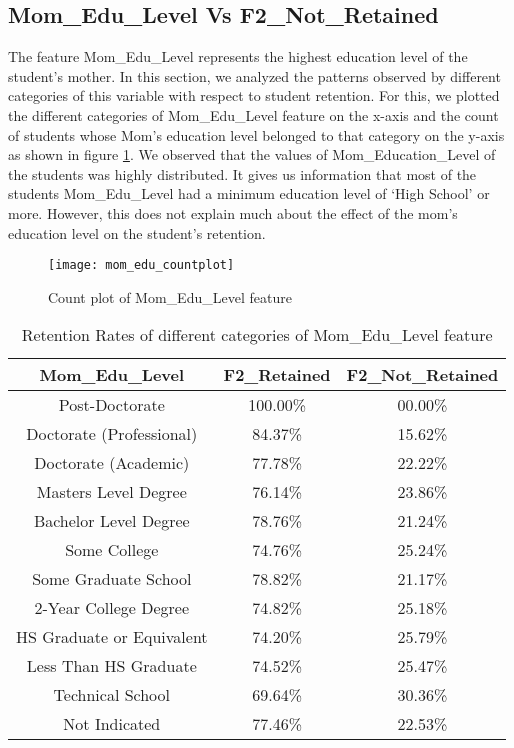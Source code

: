\documentclass[11pt,openright]{report}
\begin{document}
\subsection {Mom\_Edu\_Level	 Vs F2\_Not\_Retained}
The feature Mom\_Edu\_Level represents the highest education level of the student's mother. In this section, we analyzed the patterns observed by different categories of this variable with respect to student retention. For this, we plotted the different categories of Mom\_Edu\_Level feature on the x-axis and the count of students whose Mom's education level belonged to that category on the y-axis as shown in figure \ref{fig:mom_edu_F2NotRetained_plot}. We observed that the values of Mom\_Education\_Level of the students was highly distributed. It gives us information that most of the students Mom\_Edu\_Level had a minimum education level of `High School' or more. However, this does not explain much about the effect of the mom's education level on the student's retention.

\begin{figure}[!ht]
	\centering
	\texttt{[image: mom\_edu\_countplot]}
	\caption{Count plot of Mom\_Edu\_Level feature}
	\label{fig:mom_edu_F2NotRetained_plot}
\end{figure}

\begin{table}[!t]
	\renewcommand{\arraystretch}{1.3}
	\caption{Retention Rates of different categories of Mom\_Edu\_Level feature}
	\label{table:mom_edu_retentions}
	\centering
	\begin{tabular}{|c|c|c|}
		\hline
		\bfseries Mom\_Edu\_Level & \bfseries F2\_Retained & \bfseries F2\_Not\_Retained\\
		\hline
		Post-Doctorate  & 100.00\%  & 00.00\% \\ \hline
		Doctorate (Professional) & 84.37\% &  15.62\% \\ \hline
		Doctorate (Academic) & 77.78\% & 22.22\% \\ \hline
		Masters Level Degree    &   76.14\% &  23.86\% \\ \hline
		Bachelor Level Degree &  78.76\%  & 21.24\% \\ \hline
		Some College & 74.76\% & 25.24\% \\ \hline
		Some Graduate School  & 78.82\% &  21.17\% \\ \hline
		2-Year College Degree    &  74.82\%  & 25.18\% \\ \hline
		HS Graduate or Equivalent  & 74.20\% &  25.79\% \\ \hline
		Less Than HS Graduate     & 74.52\% &  25.47\% \\ \hline
		Technical School  &         69.64\% &  30.36\% \\ \hline
		Not Indicated         &    77.46\% & 22.53\% \\ \hline
	\end{tabular}
\end{table}
\end{document}
